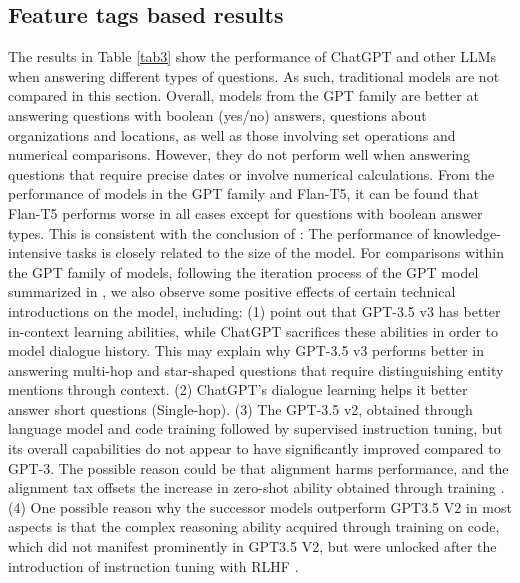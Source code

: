 \documentclass[runningheads]{llncs}
\begin{document}
\subsection{Feature tags based results}
The results in Table \ref{tab3} show the performance of ChatGPT and other LLMs when answering different types of questions. As such, traditional models are not compared in this section. 
Overall, models from the GPT family are better at answering questions with boolean (yes/no) answers, questions about organizations and locations, as well as those involving set operations and numerical comparisons. However, they do not perform well when answering questions that require precise dates or involve numerical calculations. From the performance of models in the GPT family and Flan-T5, it can be found that Flan-T5 performs worse in all cases except for questions with boolean answer types. This is consistent with the conclusion of \cite{liang2022holistic}: The performance of knowledge-intensive tasks is closely related to the size of the model. For comparisons within the GPT family of models, following the iteration process of the GPT model summarized in \cite{fu2022does}, we also observe some positive effects of certain technical introductions on the model, including: 
(1) \cite{fu2022does} point out that GPT-3.5 v3 has better in-context learning abilities, while ChatGPT sacrifices these abilities in order to model dialogue history. This may explain why GPT-3.5 v3 performs better in answering multi-hop and star-shaped questions that require distinguishing entity mentions through context. 
(2) ChatGPT's dialogue learning helps it better answer short questions (Single-hop). 
(3) The GPT-3.5 v2, obtained through language model and code training followed by supervised instruction tuning, but its overall capabilities do not appear to have significantly improved compared to GPT-3. The possible reason could be that alignment harms performance, and the alignment tax offsets the increase in zero-shot ability obtained through training \cite{ouyang2022training,liang2022holistic}. 
(4) One possible reason why the successor models outperform GPT3.5 V2 in most aspects is that the complex reasoning ability acquired through training on code, which did not manifest prominently in GPT3.5 V2, but were unlocked after the introduction of instruction tuning with RLHF \cite{chung2022scaling,ouyang2022training}.
\end{document}
